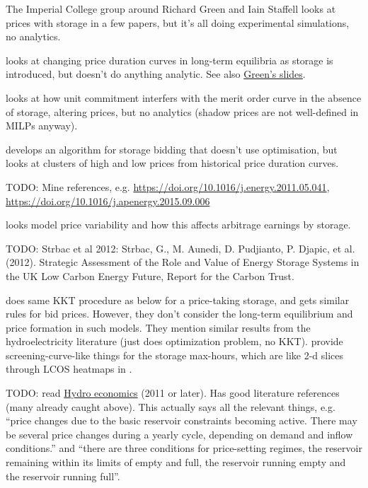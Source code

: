 \documentclass[final,3p,times]{elsarticle}
\begin{document}
The Imperial College group around Richard Green and Iain Staffell looks at prices with storage in a few papers, but it's all doing experimental simulations, no analytics.

\cite{Green2015} looks at changing price duration curves in long-term equilibria as storage is introduced, but doesn't do anything analytic. See also \href{https://spiral.imperial.ac.uk/handle/10044/1/51138}{Green's slides}.


\cite{Staffell2016} looks at how unit commitment interfers with the merit order curve in the absence of storage, altering prices, but no analytics (shadow prices are not well-defined in MILPs anyway).

\cite{Ward2018} develops an algorithm for storage bidding that doesn't use optimisation, but looks at clusters of high and low prices from historical price duration curves.

TODO: Mine \cite{Ward2018} references, e.g. \url{https://doi.org/10.1016/j.energy.2011.05.041}, \url{https://doi.org/10.1016/j.apenergy.2015.09.006}

\cite{Ward2019} looks model price variability and how this affects arbitrage earnings by storage.

TODO: Strbac et al 2012: Strbac, G., M. Aunedi, D. Pudjianto, P. Djapic, et al. (2012). Strategic Assessment of the Role and Value of
Energy Storage Systems in the UK Low Carbon Energy Future, Report for the Carbon Trust.

\cite{CRAMPES2019100746} does same KKT procedure as below for a price-taking storage, and gets similar rules for bid prices. However, they don't consider the long-term equilibrium and price formation in such models. They mention similar results from the hydroelectricity literature \cite{lederer1984overall} (just does optimization problem, no KKT). \cite{CRAMPES2019100746} provide screening-curve-like things for the storage max-hours, which are like 2-d slices through LCOS heatmaps in \cite{schmidtmelchior2019}.

TODO: read
\href{https://www.uio.no/studier/emner/sv/oekonomi/ECON4930/v11/undervisningsmateriale/Hydropower%20economics4.pdf}{Hydro
  economics} (2011 or later). Has good literature references (many already caught above). This actually says
all the relevant things, e.g. ``price changes due to the basic
reservoir constraints becoming active.  There may be several price
changes during a yearly cycle, depending on demand and inflow
conditions.'' and ``there are three conditions for price-setting regimes,
the reservoir remaining within its limits of empty and full, the reservoir running empty and the
reservoir running full''.
\end{document}
